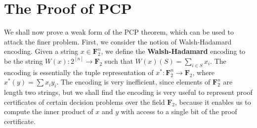 \section{The Proof of PCP}

We shall now prove a weak form of the PCP theorem, which can be used to attack the finer problem. First, we consider the notion of Walsh-Hadamard encoding. Given a string $x \in \mathbf{F}_2^n$, we define the {\bf Walsh-Hadamard} encoding to be the string $W(x): 2^{[n]} \to \mathbf{F}_2$ such that $W(x)(S) = \sum_{i \in S} x_i$. The encoding is essentially the tuple representation of $x^*: \mathbf{F}_2^n \to \mathbf{F}_2$, where $x^*(y) = \sum x_i y_i$. The encoding is very inefficient, since elements of $\mathbf{F}_2^n$ are length two strings, but we shall find the encoding is very useful to represent proof certificates of certain decision problems over the field $\mathbf{F}_2$, because it enables us to compute the inner product of $x$ and $y$ with access to a single bit of the proof certificate.

